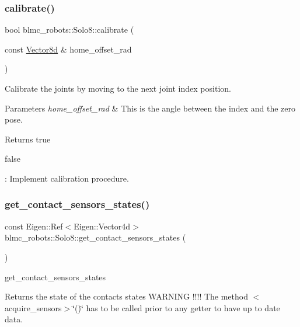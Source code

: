 \subsubsection{\texorpdfstring{calibrate()}{calibrate()}}
{\footnotesize\ttfamily bool blmc\+\_\+robots\+::\+Solo8\+::calibrate (\begin{DoxyParamCaption}\item[{const \hyperlink{common__header_8hpp_a98975ffbe0bca1296078e0350dfedd60}{Vector8d} \&}]{home\+\_\+offset\+\_\+rad }\end{DoxyParamCaption})}



Calibrate the joints by moving to the next joint index position. 


\begin{DoxyParams}{Parameters}
{\em home\+\_\+offset\+\_\+rad} & This is the angle between the index and the zero pose. \\
\hline
\end{DoxyParams}
\begin{DoxyReturn}{Returns}
true 

false 
\end{DoxyReturn}
\+: Implement calibration procedure. \mbox{\label{classblmc__robots_1_1Solo8_a2a93ab10811f7425de07ccc44ec2cc07}} 
\subsubsection{\texorpdfstring{get\+\_\+contact\+\_\+sensors\+\_\+states()}{get\_contact\_sensors\_states()}}
{\footnotesize\ttfamily const Eigen\+::\+Ref$<$Eigen\+::\+Vector4d$>$ blmc\+\_\+robots\+::\+Solo8\+::get\+\_\+contact\+\_\+sensors\+\_\+states (\begin{DoxyParamCaption}{ }\end{DoxyParamCaption})\hspace{0.3cm}{\ttfamily [inline]}}



get\+\_\+contact\+\_\+sensors\+\_\+states 

\begin{DoxyReturn}{Returns}
the state of the contacts states W\+A\+R\+N\+I\+NG !!!! The method $<$acquire\+\_\+sensors$>$\char`\"{}()\char`\"{} has to be called prior to any getter to have up to date data. 
\end{DoxyReturn}
\mbox{\label{classblmc__robots_1_1Solo8_ad9de077a2752f30109afeea1c97e77a6}} 
